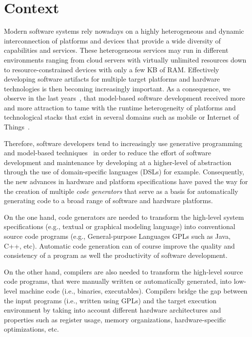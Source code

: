 

\section{Context}
Modern software systems rely nowadays on a highly heterogeneous and dynamic interconnection of platforms and devices that provide a wide diversity of capabilities and services. These heterogeneous services may run in different environments ranging from cloud servers with virtually unlimited resources down to resource-constrained devices with only a few KB of RAM. Effectively developing software artifacts for multiple target platforms and hardware technologies is then becoming increasingly important. As a consequence, we observe in the last years~\cite{Czarnecki:2000:GPM:345203}, that model-based software development received more and more attraction to tame with the runtime heterogeneity of platforms and technological stacks that exist in several domains such as mobile or Internet of Things~\cite{betz2011improving}.

Therefore, software developers tend to increasingly use generative programming~\cite{Czarnecki:2000:GPM:345203} and model-based techniques~\cite{france2007model} in order to reduce the effort of software development and maintenance by developing at a higher-level of abstraction through the use of domain-specific languages (DSLs) for example. 
Consequently, the new advances in hardware and platform specifications have paved the way for the creation of multiple \textit{code generators} that serve as a basis for automatically generating code to a broad range of software and hardware platforms. 

On the one hand, code generators are needed to transform the high-level system specifications (e.g., textual or graphical modeling language) into conventional source code programs (e.g., General-purpose Languages GPLs such as Java, C++, etc). Automatic code generation can of course improve the quality and consistency of a program as well the productivity of software development\cite{kapteijns2009comparative}.

On the other hand, compilers are also needed to transform the high-level source code programs, that were manually written or automatically generated, into low-level machine code (i.e., binaries, executables). 
Compilers bridge the gap between the input programs (i.e., written using GPLs) and the target execution environment by taking into account different hardware architectures and properties such as register usage, memory organizations, hardware-specific optimizations, etc. 


